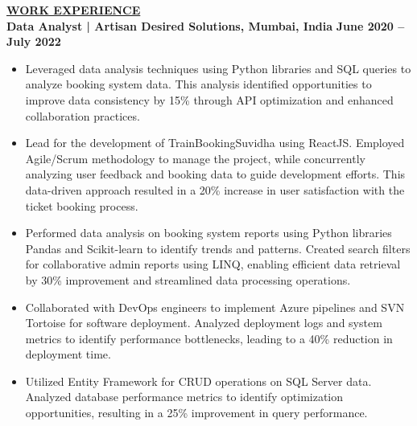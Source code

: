 \documentclass{article}
\begin{document}
\noindent \textbf{\underline{WORK EXPERIENCE}} \\
\noindent \textbf{Data Analyst | Artisan Desired Solutions, Mumbai, India}  \hfill \textbf{June 2020 – July 2022}
\begin{itemize}[noitemsep,nolistsep,leftmargin=*]
\item {\small Leveraged data analysis techniques using Python libraries and SQL queries to analyze booking system data. This analysis identified opportunities to improve data consistency by 15\% through API optimization and enhanced collaboration practices.}
\item {\small Lead for the development of TrainBookingSuvidha using ReactJS. Employed Agile/Scrum methodology to manage the project, while concurrently analyzing user feedback and booking data to guide development efforts. This data-driven approach resulted in a 20\% increase in user satisfaction with the ticket booking process.}
\item {\small Performed data analysis on booking system reports using Python libraries Pandas and Scikit-learn to identify trends and patterns. Created search filters for collaborative admin reports using LINQ, enabling efficient data retrieval by 30\% improvement and streamlined data processing operations.}
\item {\small Collaborated with DevOps engineers to implement Azure pipelines and SVN Tortoise for software deployment. Analyzed deployment logs and system metrics to identify performance bottlenecks, leading to a 40\% reduction in deployment time.}
\item {\small Utilized Entity Framework for CRUD operations on SQL Server data. Analyzed database performance metrics to identify optimization opportunities, resulting in a 25\% improvement in query performance.}
\end{itemize}
\vspace{1mm}
\end{document}
